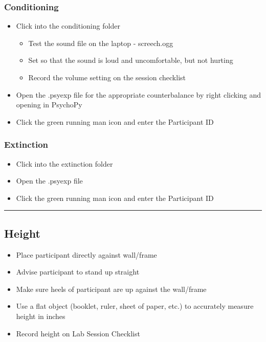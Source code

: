 \documentclass[]{book}
\providecommand{\tightlist}{%
  \setlength{\itemsep}{0pt}\setlength{\parskip}{0pt}}
\begin{document}
\hypertarget{conditioning}{%
\subsubsection{Conditioning}\label{conditioning}}

\begin{itemize}
\tightlist
\item
  Click into the conditioning folder

  \begin{itemize}
  \tightlist
  \item
    Test the sound file on the laptop - screech.ogg
  \item
    Set so that the sound is loud and uncomfortable, but not hurting
  \item
    Record the volume setting on the session checklist
  \end{itemize}
\item
  Open the .psyexp file for the appropriate counterbalance by right clicking and opening in PsychoPy
\item
  Click the green running man icon and enter the Participant ID
\end{itemize}

\hypertarget{extinction}{%
\subsubsection{Extinction}\label{extinction}}

\begin{itemize}
\tightlist
\item
  Click into the extinction folder
\item
  Open the .psyexp file
\item
  Click the green running man icon and enter the Participant ID
\end{itemize}

\begin{center}\rule{0.5\linewidth}{0.5pt}\end{center}

\hypertarget{height}{%
\subsection{Height}\label{height}}

\begin{itemize}
\tightlist
\item
  Place participant directly against wall/frame
\item
  Advise participant to stand up straight
\item
  Make sure heels of participant are up against the wall/frame
\item
  Use a flat object (booklet, ruler, sheet of paper, etc.) to accurately measure height in inches
\item
  Record height on Lab Session Checklist
\end{itemize}
\end{document}
